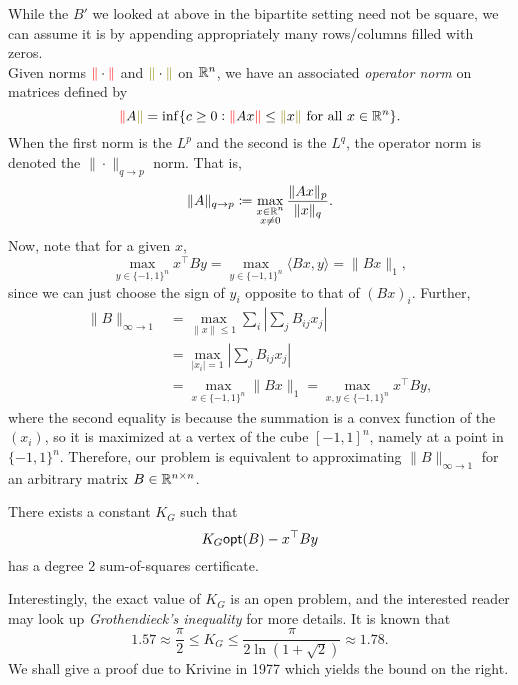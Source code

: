 	While the $B'$ we looked at above in the bipartite setting need not be square, we can assume it is by appending appropriately many rows/columns filled with zeros.\\
	Given norms ${\color{red}{\|}}\cdot{\color{red}{\|}}$ and ${\color{olive}{\|}}\cdot{\color{olive}{\|}}$ on $\mathbb{R}^n$, we have an associated \emph{operator norm} on matrices defined by
	\[ {\color{red}{\|}}A{\color{olive}{\|}} = \inf\{c \ge 0 : {\color{red}{\|}}Ax{\color{red}{\|}} \le {\color{olive}{\|}}x{\color{olive}{\|}} \text{ for all }x\in\R^n \}. \]
	When the first norm is the $L^p$ and the second is the $L^q$, the operator norm is denoted the $\|\cdot\|_{q \to p}$ norm. That is,
	\[ \|A\|_{q \to p} \coloneqq \max_{\substack{x \in \mathbb{R}^n \\ x \ne 0}} \frac{\|Ax\|_p}{\|x\|_q}. \]
	Now, note that for a given $x$,
	\[ \max_{y \in \{-1,1\}^n} x^\top B y = \max_{y \in \{-1,1\}^n} \langle Bx , y\rangle = \|Bx\|_1, \]
	since we can just choose the sign of $y_i$ opposite to that of $(Bx)_i$. Further,
	\begin{align*}
		\|B\|_{\infty \to 1} &= \max_{\|x\| \le 1} \sum_i \left|\sum_j B_{ij} x_j\right| \\
			&= \max_{|x_i| = 1} \left|\sum_j B_{ij} x_j\right| \\
			&= \max_{x \in \{-1,1\}^n} \|Bx\|_1 = \max_{x,y \in \{-1,1\}^n} x^\top B y,
	\end{align*}
	where the second equality is because the summation is a convex function of the $(x_i)$, so it is maximized at a vertex of the cube $[-1,1]^n$, namely at a point in $\{-1,1\}^n$.
	Therefore, our problem is equivalent to approximating $\|B\|_{\infty \to 1}$ for an arbitrary matrix $B \in \mathbb{R}^{n \times n}$.

	\begin{ftheo}
		There exists a constant $K_G$ such that
		\[ K_G \mathsf{opt}(B) - x^\top B y \]
		has a degree $2$ sum-of-squares certificate.
	\end{ftheo}
	Interestingly, the exact value of $K_G$ is an open problem, and the interested reader may look up \emph{Grothendieck's inequality} for more details. It is known that
	\[ 1.57 \approx \frac{\pi}{2} \le K_G \le \frac{\pi}{2\ln(1+\sqrt{2})} \approx 1.78. \]
	We shall give a proof due to Krivine in 1977 which yields the bound on the right.

